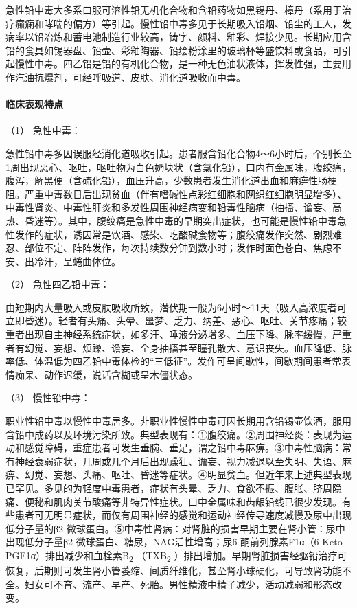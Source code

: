 急性铅中毒大多系口服可溶性铅无机化合物和含铅药物如黑锡丹、樟丹（系用于治疗癫痫和哮喘的偏方）等引起。慢性铅中毒多见于长期吸入铅烟、铅尘的工人，发病率以铅冶炼和蓄电池制造行业较高，铸字、颜料、釉彩、焊接少见。长期应用含铅的食具如锡器盘、铅壶、彩釉陶器、铅绘粉涂里的玻璃杯等盛饮料或食品，可引起慢性中毒。四乙铅是铅的有机化合物，是一种无色油状液体，挥发性强，主要用作汽油抗爆剂，可经呼吸道、皮肤、消化道吸收而中毒。

\paragraph{临床表现特点}

\hypertarget{text00157.htmlux5cux23CHP5-6-1-2-2-1}{}
（1） 急性中毒：

急性铅中毒多因误服经消化道吸收引起。患者服含铅化合物4～6小时后，个别长至1周出现恶心、呕吐，呕吐物为白色奶块状（含氯化铅），口内有金属味，腹绞痛，腹泻，解黑便（含硫化铅），血压升高，少数患者发生消化道出血和麻痹性肠梗阻。严重中毒数日后出现贫血（伴有嗜碱性点彩红细胞和网织红细胞明显增多）、中毒性肾炎、中毒性肝炎和多发性周围神经病变和铅毒性脑病（抽搐、谵妄、高热、昏迷等）。其中，腹绞痛是急性中毒的早期突出症状，也可能是慢性铅中毒急性发作的症状，诱因常是饮酒、感染、吃酸碱食物等；腹绞痛发作突然、剧烈难忍、部位不定、阵阵发作，每次持续数分钟到数小时；发作时面色苍白、焦虑不安、出冷汗，呈蜷曲体位。

\hypertarget{text00157.htmlux5cux23CHP5-6-1-2-2-2}{}
（2） 急性四乙铅中毒：

由短期内大量吸入或皮肤吸收所致，潜伏期一般为6小时～11天（吸入高浓度者可立即昏迷）。轻者有头痛、头晕、噩梦、乏力、纳差、恶心、呕吐、关节疼痛；较重者出现自主神经系统症状，如多汗、唾液分泌增多、血压下降、脉率缓慢，严重者有幻觉、妄想、烦躁、谵妄、全身抽搐甚至瞳孔散大、意识丧失。血压降低、脉率低、体温低为四乙铅中毒体检的“三低征”。发作可呈间歇性，间歇期间患者常表情痴呆、动作迟缓，说话含糊或呈木僵状态。

\hypertarget{text00157.htmlux5cux23CHP5-6-1-2-2-3}{}
（3） 慢性铅中毒：

职业性铅中毒以慢性中毒居多。非职业性慢性中毒可因长期用含铅锡壶饮酒，服用含铅中成药以及环境污染所致。典型表现有：①腹绞痛。②周围神经炎：表现为运动和感觉障碍，重症患者可发生垂腕、垂足，谓之铅中毒麻痹。③中毒性脑病：常有神经衰弱症状，几周或几个月后出现躁狂、谵妄、视力减退以至失明、失语、麻痹、幻觉、妄想、头痛、呕吐、昏迷等症状。④明显贫血。但近年来上述典型表现已罕见。多见的为轻度中毒患者，症状有头晕、乏力、食欲不振、腹胀、脐周隐痛、便秘和肌肉关节酸痛等非特异性症状。口中金属味和齿龈铅线已很少发现。有些患者可无明显症状，而仅有周围神经的感觉和运动神经传导速度减慢及尿中出现低分子量的β2-微球蛋白。⑤中毒性肾病：对肾脏的损害早期主要在肾小管：尿中出现低分子量β2-微球蛋白、糖尿，NAG活性增高；尿6-酮前列腺素F1α（6-Keto-PGF1α）排出减少和血栓素B\textsubscript{2}
（TXB\textsubscript{2}
）排出增加。早期肾脏损害经驱铅治疗可恢复，后期则可发生肾小管萎缩、间质纤维化，甚至肾小球硬化，可导致肾功能不全。妇女可不育、流产、早产、死胎。男性精液中精子减少，活动减弱和形态改变。

